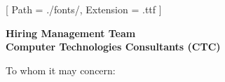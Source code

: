 


\renewcommand{\photo}[2]{}

\geometry{
  left=2cm,
  right=2cm,
  top=2cm,
  bottom=2cm
}



\makecvheader

\setmainfont{NotoSans-Regular}[
  Path = ./fonts/,
  Extension = .ttf
]

\vspace{1cm}
\indent\textbf{Hiring Management Team}\\
\indent\textbf{Computer Technologies Consultants (CTC)}

\vspace{0.5cm}

\noindent To whom it may concern:

\vspace{0.5cm}

